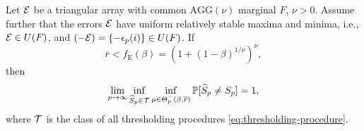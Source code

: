 \begin{theorem} \label{thm:necessary}
    Let ${\cal E}$ be a triangular array with common $\text{AGG}(\nu)$ marginal $F$, $\nu > 0$.
    Assume further that the errors ${\cal E}$ have uniform relatively stable maxima and minima, i.e., ${\cal E}\in U(F)$, and $(-{\cal E}) = \{-\epsilon_{p}(i)\} \in U(F)$.
    If 
    \begin{equation} \label{eq:signal-below-boundary}
        \overline{r} < f_{\mathrm{E}}(\beta) = \left(1+(1-\beta)^{1/\nu}\right)^\nu,
    \end{equation}
    then
    \begin{equation} \label{eq:classification-impossible-dependent}
        \lim_{p\to\infty} \inf_{\widehat{S}_p\in{\cal T}} \inf_{\mu\in{\Theta_p^-(\beta, \overline{r})}} \P[\widehat{S}_p \neq S_p] = 1,
    \end{equation}
    where ${\cal T}$ is the class of all thresholding procedures \eqref{eq:thresholding-procedure}.
\end{theorem}
